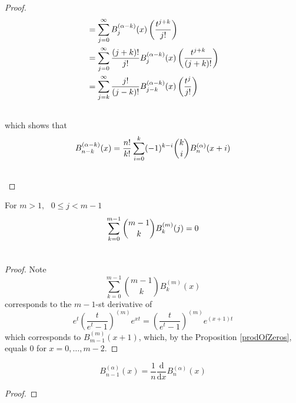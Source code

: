 \documentclass[fleqn,a4paper,9pt]{article}
\begin{document}
\begin{flushleft}
\begin{proof}
\begin{align}
&=\sum_{j=0}^\infty B_j^{(\alpha-k)}(x)\left(\frac{t^{j+k}}{j!}\right)\\\notag
&=\sum_{j=0}^\infty\frac{(j+k)!}{j!} B_j^{(\alpha-k)}(x)\left(\frac{t^{j+k}}{(j+k)!}\right)\\\notag
&=\sum_{j=k}^\infty\frac{j!}{(j-k)!} B_{j-k}^{(\alpha-k)}(x)\left(\frac{t^j}{j!}\right)\\\notag
\end{align}
which shows that
\begin{align}
B_{n-k}^{(\alpha-k)}(x)=\frac{n!}{k!}\sum_{i=0}^k(-1)^{k-i} \binom{k}{i}B_n^{(\alpha)}(x+i)\\\notag
\end{align}
\end{proof}

\begin{corollary}
For $m>1,\text{  } 0\le j<m-1$
\begin{align}
\sum_{k=0}^{m-1}\binom{m-1}{k}B_k^{(m)}(j)&=0\\\notag
\end{align}
\end{corollary}
\begin{proof}
Note $$\sum_{k=0}^{m-1}\binom{m-1}{k}B_k^{(m)}(x)$$ corresponds to the $m-1$-st derivative of
$$e^t\left(\frac{t}{e^t-1}\right)^{(m)} e^{xt}=\left(\frac{t}{e^t-1}\right)^{(m)} e^{(x+1)t}$$
which corresponds to $B_{m-1}^{(m)}(x+1)$, which, by the Proposition \ref{prodOfZeros}, equals 0 for $x=0,\ldots,m-2$.
\end{proof}
\begin{proposition}\label{derivB}
$$B_{n-1}^{(\alpha)}(x)=\frac{1}{n}\frac{ \mathrm{  d  }   }{\mathrm{d}x }B_n^{(\alpha)}(x)$$
\end{proposition}
\begin{proof}


\end{proof}
\end{flushleft}
\end{document}
